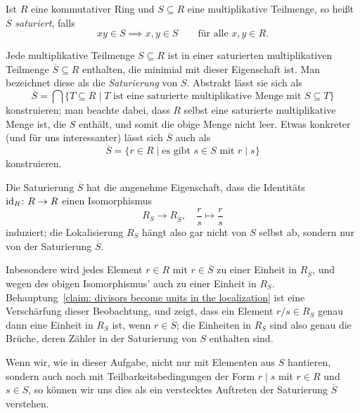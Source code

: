 \documentclass[a4paper,10pt,numbers=noenddot]{scrartcl}
\begin{document}
\begin{remark}
  Ist $R$ eine kommutativer Ring und $S \subseteq R$ eine multiplikative Teilmenge, so heißt $S$ \emph{saturiert}, falls
  \[
    x y \in S \implies x, y \in S
    \qquad
    \text{für alle $x, y \in R$}.
  \]
  
  Jede multiplikative Teilmenge $S \subseteq R$ ist in einer saturierten multiplikativen Teilmenge $\overline{S} \subseteq R$ enthalten, die minimial mit dieser Eigenschaft ist.
  Man bezeichnet diese als die \emph{Saturierung} von $S$.
  Abstrakt lässt sie sich als
  \[
      \overline{S}
    = \bigcap \{
                T \subseteq R
              \mid
                \text{$T$ ist eine saturierte multiplikative Menge mit $S \subseteq T$}
              \}
  \]
  konstruieren; man beachte dabei, dass $R$ selbst eine saturierte multiplikative Menge ist, die $S$ enthält, und somit die obige Menge nicht leer.
  Etwas konkreter (und für uns interessanter) lässt sich $\overline{S}$ auch als
  \[
      \overline{S}
    = \{
        r \in R
        \mid
        \text{es gibt $s \in S$ mit $r \mid s$}
      \}
  \]
  konstruieren.
  
  Die Saturierung $\overline{S}$ hat die angenehme Eigenschaft, dass die Identitäts $\operatorname{id}_R \colon R \to R$ einen Isomorphismus
  \[
    R_S \to R_{\overline{S}},
    \quad
    \frac{r}{s} \mapsto \frac{r}{s}
  \]
  induziert; die Lokalisierung $R_S$ hängt also gar nicht von $S$ selbst ab, sondern nur von der Saturierung $\overline{S}$.
  
  Inbesondere wird jedes Element $r \in R$ mit $r \in \overline{S}$ zu einer Einheit in $R_{\overline{S}}$, und wegen des obigen Isomorphismus’ auch zu einer Einheit in $R_S$.
  Behauptung~\ref{claim: divisors become units in the localization} ist eine Verschärfung dieser Beobachtung, und zeigt, dass ein Element $r/s \in R_S$ genau dann eine Einheit in $R_S$ ist, wenn $r \in \overline{S}$; die Einheiten in $R_S$ sind also genau die Brüche, deren Zähler in der Saturierung von $S$ enthalten sind.
  
  Wenn wir, wie in dieser Aufgabe, nicht nur mit Elementen aus $S$ hantieren, sondern auch noch mit Teilbarkeitsbedingungen der Form $r \mid s$ mit $r \in R$ und $s \in S$, so können wir uns dies als ein verstecktes Auftreten der Saturierung $\overline{S}$ verstehen.
\end{remark}





\subsection{}
\label{subsec: primes become primes in the localization}
\end{document}
